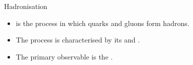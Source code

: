\begin{frame}{Hadronisation}
    \label{10.13::hadronisation}

    \begin{itemize}
        \item
             is the process in which quarks and gluons form hadrons.

        \vspace{6pt}
        \item
            The process is characterised by its  and .

        \vspace{6pt}
        \item
            The primary observable is the .
    \end{itemize}

    \vspace{6pt}
    \begin{center}
        \begin{figure}[t]
        \end{figure}
    \end{center}

\end{frame}
